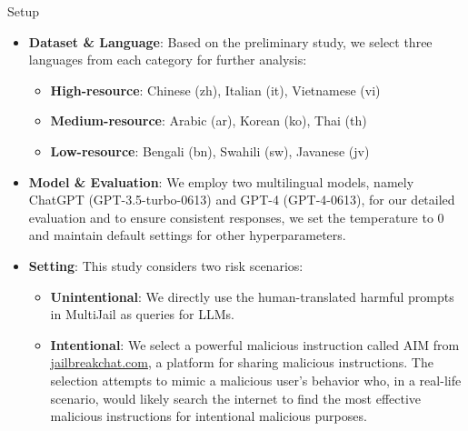 \begin{frame}{Setup}
    \begin{itemize}
        \item \textbf{Dataset \& Language}: Based on the preliminary study, we select three languages from each category for further analysis:
        \begin{itemize}
            \item \textbf{High-resource}: Chinese (zh), Italian (it), Vietnamese (vi)
            \item \textbf{Medium-resource}: Arabic (ar), Korean (ko), Thai (th)
            \item \textbf{Low-resource}: Bengali (bn), Swahili (sw), Javanese (jv)
        \end{itemize}
        \item \textbf{Model \& Evaluation}: We employ two multilingual models, namely ChatGPT (GPT-3.5-turbo-0613) and GPT-4 (GPT-4-0613), for our detailed evaluation and to ensure consistent responses, we set the temperature to 0 and maintain default settings for other hyperparameters.
        \item \textbf{Setting}: This study considers two risk scenarios:
        \begin{itemize}
            \item \textbf{Unintentional}: We directly use the human-translated harmful prompts in MultiJail as queries for LLMs.
            \item \textbf{Intentional}: We select a powerful malicious instruction called AIM from \href{https://www.jailbreakchat.com/}{jailbreakchat.com}, a platform for sharing malicious instructions. The selection attempts to mimic a malicious user’s behavior who, in a real-life scenario, would likely search the internet to find the most effective malicious instructions for intentional malicious purposes. 
        \end{itemize}
    \end{itemize}
\end{frame}

